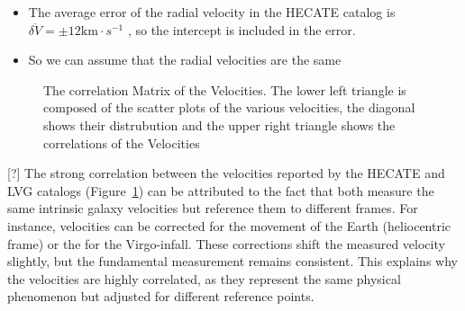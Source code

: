 \documentclass[
]{article}
\providecommand{\tightlist}{%
  \setlength{\itemsep}{0pt}\setlength{\parskip}{0pt}}\usepackage{longtable,booktabs,array}
\begin{document}
\begin{itemize}
\tightlist
\item
  The average error of the radial velocity in the HECATE catalog is
  \(\overline{\delta V} = \pm 12\text{km}\cdot s^{-1}\) , so the
  intercept is included in the error.
\item
  So we can assume that the radial velocities are the same
\end{itemize}

\begin{figure}


\caption{\label{fig-vel-pairplot}The correlation Matrix of the
Velocities. The lower left triangle is composed of the scatter plots of
the various velocities, the diagonal shows their distrubution and the
upper right triangle shows the correlations of the Velocities}

\end{figure}%

{[}?{]} The strong correlation between the velocities reported by the
HECATE and LVG catalogs (Figure~\ref{fig-vel-pairplot}) can be
attributed to the fact that both measure the same intrinsic galaxy
velocities but reference them to different frames. For instance,
velocities can be corrected for the movement of the Earth (heliocentric
frame) or the for the Virgo-infall. These corrections shift the measured
velocity slightly, but the fundamental measurement remains consistent.
This explains why the velocities are highly correlated, as they
represent the same physical phenomenon but adjusted for different
reference points.
\end{document}
